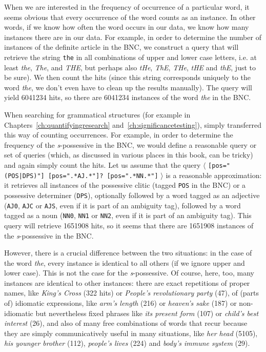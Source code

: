 When we are interested in the frequency  of occurrence of a particular word, it seems obvious that every occurrence of the word counts as an instance. In other words, if we know how often the word occurs in our data, we know how many instances there are in our data. For example, in order to determine the number of instances of the definite article  in the BNC,  we construct a query that will retrieve  the string \texttt{the} in all combinations of upper and lower case letters, i.e. at least \textit{the}, \textit{The}, and \textit{THE}, but perhaps also \textit{tHe}, \textit{ThE}, \textit{THe}, \textit{tHE} and \textit{thE}, just to be sure). We then count the hits (since this string corresponds uniquely to the word \textit{the}, we don't even have to clean up the results manually).  The query will yield \num{6041234} hits, so there are \num{6041234} instances of the word \textit{the} in the  BNC.

When searching for grammatical  structures (for example in Chapters~\ref{ch:quantifyingresearch} and~\ref{ch:significancetesting}), simply transferred this way of counting occurrences. For example, in order to determine the frequency  of the \textit{s}-possessive  in the BNC,  we would define a reasonable query or set of queries (which, as discussed in various places in this book, can be tricky) and again simply count the hits.  Let us assume that the query $\langle$ \texttt{[pos="(POS|DPS)"] [pos=".*AJ.*"]? [pos=".*NN.*"]} $\rangle$ is a reasonable approximation: it retrieves  all instances of the possessive clitic  (tagged \texttt{POS} in the BNC)  or a possessive determiner  (\texttt{DPS}), optionally followed by a word tagged  as an adjective  (\texttt{AJ0}, \texttt{AJC} or \texttt{AJS}, even if it is part of an ambiguity  tag), followed by a word tagged as a noun  (\texttt{NN0}, \texttt{NN1} or \texttt{NN2}, even if it is part of an ambiguity tag). This query will retrieve \num{1651908} hits, so it seems that there are \num{1651908} instances of the \textit{s}-possessive  in the  BNC.

However, there is a crucial difference between the two situations: in the case of the word \textit{the}, every instance is identical to all others (if we ignore upper and lower case). This is not the case for the \textit{s}-possessive. Of course, here, too, many instances are identical to other instances: there are exact repetitions of proper names, like \textit{King's Cross} (322 hits) or \textit{People's revolutionary party} (47), of (parts of) idiomatic  expressions, like \textit{arm's length} (216) or \textit{heaven's sake} (187) or non\hyp{}idiomatic but nevertheless fixed phrases like \textit{its present form} (107) or \textit{child's best interest} (26), and also of many free combinations of words that recur because they are simply communicatively useful in many situations, like \textit{her head} (5105), \textit{his younger brother} (112), \textit{people's lives} (224) and \textit{body's immune system} (29).

